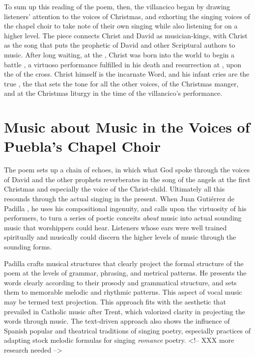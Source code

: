 To sum up this reading of the poem, then, the villancico began by drawing
listeners' attention to the voices of Christmas, and exhorting the singing
voices of the chapel choir to take note of their own singing while also
listening for  on a higher level.
The piece connects Christ and David as musician-kings, with Christ as the song
that puts the prophetic  of David and other Scriptural authors to
music.
After long waiting, at the , Christ was born into the world to
begin a battle , a virtuoso performance fulfilled in his death and
resurrection at , upon the  of the cross.
Christ himself is the incarnate Word, and his infant cries are the true , the  that sets the tone for all the other voices,  of the Christmas manger, and at the Christmas liturgy in the
time of the villancico's performance.

\section{Music about Music in the Voices of Puebla's Chapel Choir}

The poem sets up a chain of echoes, in which what God spoke through the voices of
David and the other prophets reverberates in the song of the angels at the first
Christmas and especially the voice of the Christ-child. 
Ultimately all this resounds through the actual 
singing in the present.
When Juan Gutiérrez de Padilla , he uses his
compositional ingenuity, and calls upon the virtuosity of his performers, to
turn a series of poetic conceits \emph{about} music into actual sounding music that
worshippers could hear.
Listeners whose ears were well trained spiritually and musically could discern
the higher levels of music through the sounding forms.

Padilla crafts musical structures that clearly project the formal structure of
the poem at the levels of grammar, phrasing, and metrical patterns.
He presents the words clearly according to their prosody and grammatical
structure, and sets them to memorable melodic and rhythmic patterns.
This aspect of vocal music may be termed text projection.
This approach fits with the aesthetic that prevailed in Catholic music after
Trent, which valorized clarity in projecting the words through music.
The text-driven approach also shows the influence of Spanish popular and
theatrical traditions of singing poetry, especially practices of adapting stock
melodic formulas for singing \emph{romance} poetry.
<!-- XXX more research needed -->


